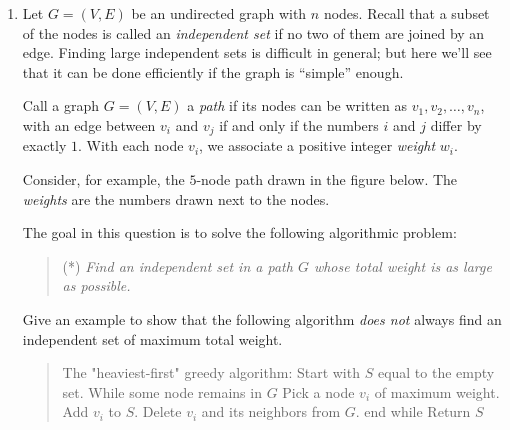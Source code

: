 \documentclass[12pt]{article}
\begin{document}
\begin{enumerate}
{An analogous observation holds if the optimal plan ends in SF.
Thus, if $OPT_N(j)$ denotes the minimum cost of a plan 
on months $1, \ldots, j$ ending in NY, and 
$OPT_S(j)$ denotes the minimum cost of a plan 
on months $1, \ldots, j$ ending in SF, then
$$OPT_N(n) = N_n + \min(OPT_N(n-1), M + OPT_S(n-1))$$
$$OPT_S(n) = S_n + \min(OPT_S(n-1), M + OPT_N(n-1))$$
This can be translated directly into an algorithm:
\begin{quote}
\begin{code}
$OPT_N(0) = OPT_S(0) = 0$
For $i = 1, \ldots, n$
  $OPT_N(i) = N_i + \min(OPT_N(i-1), M + OPT_S(i-1))$
  $OPT_S(i) = S_i + \min(OPT_S(i-1), M + OPT_N(i-1))$
End
Return the smaller of $OPT_N(n)$ and $OPT_S(n)$
\end{code}
\end{quote}
The algorithm has $n$ iterations, and each takes constant
time.  Thus the running time is $O(n)$.

}


\item

Let $G = (V,E)$ be an undirected graph with $n$ nodes.
Recall that a subset of the nodes is called an {\em independent set}
if no two of them are joined by an edge.
Finding large independent sets is difficult in general;
but here we'll see that it can be done efficiently if the
graph is ``simple'' enough.

Call a graph $G = (V,E)$ a {\em path} if its nodes can be
written as $v_1, v_2, \ldots, v_n$, with an edge between
$v_i$ and $v_j$ if and only if the numbers $i$ and $j$ differ by exactly $1$.
With each node $v_i$, we associate a positive integer {\em weight} $w_i$.

Consider, for example, the $5$-node path drawn in the figure below.
The {\em weights} are the numbers drawn next to the nodes.

The goal in this question is to solve the following algorithmic
problem:
\begin{quote}
(*) {\em Find an independent set in a path $G$ whose total weight is as large
as possible.}
\end{quote}

Give an example to show that the following algorithm
{\em does not} always find an independent set of maximum
total weight.
\begin{quote}
\begin{code}
The "heaviest-first" greedy algorithm:
  Start with $S$ equal to the empty set.
  While some node remains in $G$
    Pick a node $v_i$ of maximum weight.
    Add $v_i$ to $S$.
    Delete $v_i$ and its neighbors from $G$.
  end while
  Return $S$
\end{code}
\end{quote}


\end{enumerate}
\end{document}
